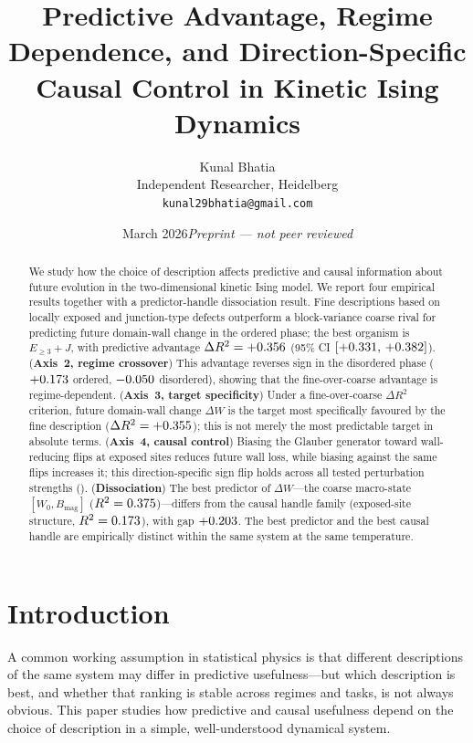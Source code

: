 \documentclass[11pt,a4paper]{article}
\title{\textbf{Predictive Advantage, Regime Dependence, and Direction-Specific\\
Causal Control in Kinetic Ising Dynamics}}
\author{Kunal Bhatia\\
\small Independent Researcher, Heidelberg\\
\small \texttt{kunal29bhatia@gmail.com}}
\date{March 2026\quad\textit{Preprint --- not peer reviewed}}
\begin{document}
\maketitle

\begin{abstract}
We study how the choice of description affects predictive and causal information about future evolution in the two-dimensional kinetic Ising model. We report four empirical results together with a predictor-handle dissociation result.
Fine descriptions based on locally exposed and junction-type defects outperform a
block-variance coarse rival for predicting future domain-wall change in
the ordered phase; the best organism is $E_{\geq 3}+J$, with predictive
advantage $\Delta R^2 = +0.356$
(95\% CI $[+0.331,\,+0.382]$).
(\textbf{Axis~2, regime crossover})\; This advantage reverses sign in the
disordered phase ($+0.173$ ordered, $-0.050$ disordered),
showing that the fine-over-coarse advantage is regime-dependent.
(\textbf{Axis~3, target specificity})\; Under a fine-over-coarse
$\Delta R^2$ criterion, future domain-wall change $\Delta W$ is the
target most specifically favoured by the fine description
($\Delta R^2 = +0.355$); this is not merely the most predictable
target in absolute terms.
(\textbf{Axis~4, causal control})\; Biasing the Glauber generator toward
wall-reducing flips at exposed sites reduces future wall loss, while
biasing against the same flips increases it; this direction-specific sign
flip holds across all tested perturbation strengths (\AxisBSignFlips{}).
(\textbf{Dissociation})\; The best predictor of $\Delta W$---the coarse
macro-state $[W_0, B_\mathrm{mag}]$ ($R^2 = 0.375$)---differs from
the causal handle family (exposed-site structure, $R^2 = 0.173$),
with gap $+0.203$.
The best predictor and the best causal handle are empirically distinct within the same system at the same temperature.
\end{abstract}

\section{Introduction}
\label{sec:intro}

A common working assumption in statistical physics is that different
descriptions of the same system may differ in predictive usefulness---but
which description is best, and whether that ranking is stable across
regimes and tasks, is not always obvious.
This paper studies how predictive and causal usefulness depend on the
choice of description in a simple, well-understood dynamical system.
\end{document}
